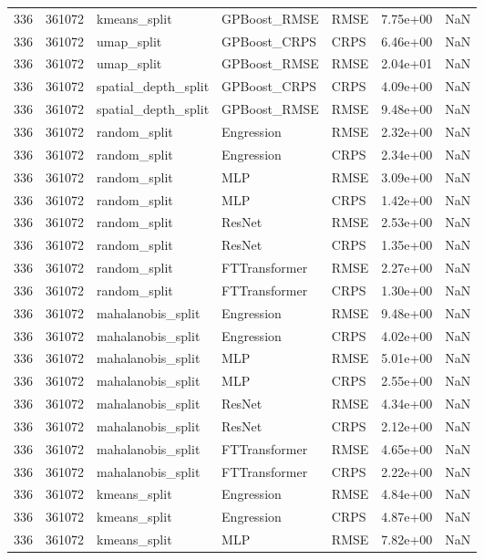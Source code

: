 \begin{tabular}{rrlllrr}
336 & 361072 & kmeans\_split & GPBoost\_RMSE & RMSE & 7.75e+00 & NaN \\
336 & 361072 & umap\_split & GPBoost\_CRPS & CRPS & 6.46e+00 & NaN \\
336 & 361072 & umap\_split & GPBoost\_RMSE & RMSE & 2.04e+01 & NaN \\
336 & 361072 & spatial\_depth\_split & GPBoost\_CRPS & CRPS & 4.09e+00 & NaN \\
336 & 361072 & spatial\_depth\_split & GPBoost\_RMSE & RMSE & 9.48e+00 & NaN \\
336 & 361072 & random\_split & Engression & RMSE & 2.32e+00 & NaN \\
336 & 361072 & random\_split & Engression & CRPS & 2.34e+00 & NaN \\
336 & 361072 & random\_split & MLP & RMSE & 3.09e+00 & NaN \\
336 & 361072 & random\_split & MLP & CRPS & 1.42e+00 & NaN \\
336 & 361072 & random\_split & ResNet & RMSE & 2.53e+00 & NaN \\
336 & 361072 & random\_split & ResNet & CRPS & 1.35e+00 & NaN \\
336 & 361072 & random\_split & FTTransformer & RMSE & 2.27e+00 & NaN \\
336 & 361072 & random\_split & FTTransformer & CRPS & 1.30e+00 & NaN \\
336 & 361072 & mahalanobis\_split & Engression & RMSE & 9.48e+00 & NaN \\
336 & 361072 & mahalanobis\_split & Engression & CRPS & 4.02e+00 & NaN \\
336 & 361072 & mahalanobis\_split & MLP & RMSE & 5.01e+00 & NaN \\
336 & 361072 & mahalanobis\_split & MLP & CRPS & 2.55e+00 & NaN \\
336 & 361072 & mahalanobis\_split & ResNet & RMSE & 4.34e+00 & NaN \\
336 & 361072 & mahalanobis\_split & ResNet & CRPS & 2.12e+00 & NaN \\
336 & 361072 & mahalanobis\_split & FTTransformer & RMSE & 4.65e+00 & NaN \\
336 & 361072 & mahalanobis\_split & FTTransformer & CRPS & 2.22e+00 & NaN \\
336 & 361072 & kmeans\_split & Engression & RMSE & 4.84e+00 & NaN \\
336 & 361072 & kmeans\_split & Engression & CRPS & 4.87e+00 & NaN \\
336 & 361072 & kmeans\_split & MLP & RMSE & 7.82e+00 & NaN \\

\end{tabular}
